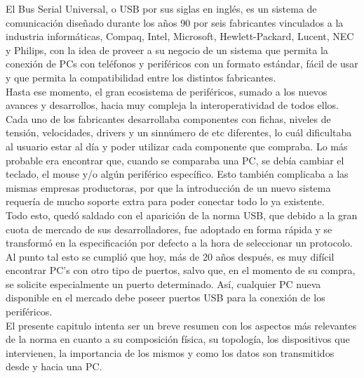 El Bus Serial Universal, o USB por sus siglas en inglés, es un sistema de comunicación diseñado durante los años 90 por seis fabricantes vinculados a la industria informáticas, Compaq, Intel, Microsoft, Hewlett-Packard, Lucent, NEC y Philips, con la idea de proveer a su negocio de un sistema que permita la conexión de PCs con teléfonos y periféricos con un formato estándar, fácil de usar y que permita la compatibilidad entre los distintos fabricantes.\\

Hasta ese momento, el gran ecosistema de periféricos, sumado a los nuevos avances y desarrollos, hacia muy compleja la interoperatividad de todos ellos. Cada uno de los fabricantes desarrollaba componentes con fichas, niveles de tensión, velocidades, drivers y un sinnúmero de etc diferentes, lo cuál dificultaba al usuario estar al día y poder utilizar cada componente que compraba. Lo más probable era encontrar que, cuando se comparaba una PC, se debía cambiar el teclado, el mouse y/o algún periférico específico. Esto también complicaba a las mismas empresas productoras, por que la introducción de un nuevo sistema requería de mucho soporte extra para poder conectar todo lo ya existente.\\

Todo esto, quedó saldado con el aparición de la norma USB, que debido a la gran cuota de mercado de sus desarrolladores, fue adoptado en forma rápida y se transformó en la especificación por defecto a la hora de seleccionar un protocolo. Al punto tal esto se cumplió que hoy, más de 20 años después, es muy difícil encontrar PC's con otro tipo de puertos, salvo que, en el momento de su compra, se solicite especialmente un puerto determinado. Así, cualquier PC nueva disponible en el mercado debe poseer puertos USB para la conexión de los periféricos.\\

El presente capitulo intenta ser un breve resumen con los aspectos más relevantes de la norma en cuanto a su composición física, su topología, los dispositivos que intervienen, la importancia de los mismos y como los datos son transmitidos desde y hacia una PC.\\


